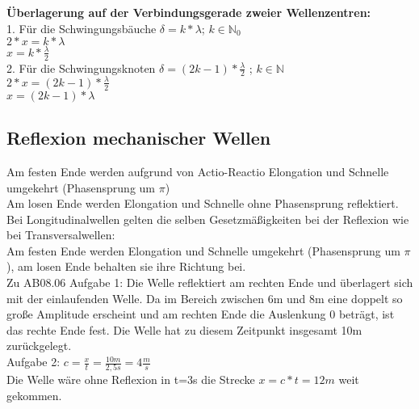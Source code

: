 \textbf{Überlagerung auf der Verbindungsgerade zweier Wellenzentren:}
\vspace{2mm} \\
1. Für die Schwingungsbäuche $ \delta = k \ast \lambda $; $ k \in \mathbb{N}_{0} $
\vspace{1mm} \\
$ 2 \ast x = k \ast \lambda $
\vspace{1mm} \\
$ x = k \ast \frac{\lambda}{2} $
\vspace{3mm} \\
2. Für die Schwingungsknoten $ \delta = (2k -1) \ast \frac{\lambda}{2} $ ; $ k \in \mathbb{N}$
\vspace{1mm} \\
$ 2 \ast x = (2k-1) \ast \frac{\lambda}{2} $
\vspace{1mm} \\
$ x = (2k-1) \ast \lambda $

\subsection{Reflexion mechanischer Wellen}
Am festen Ende werden aufgrund von Actio-Reactio Elongation und Schnelle umgekehrt (Phasensprung um $\pi$) \\
Am losen Ende werden Elongation und Schnelle ohne Phasensprung reflektiert.
\vspace{5mm}\\

Bei Longitudinalwellen gelten die selben Gesetzmäßigkeiten bei der Reflexion wie bei Transversalwellen: \\
Am festen Ende werden Elongation und Schnelle umgekehrt (Phasensprung um $\pi$), am losen Ende behalten sie ihre Richtung bei. 
\vspace{2mm} \\
Zu AB08.06 Aufgabe 1: Die Welle reflektiert am rechten Ende und überlagert sich mit der einlaufenden Welle. Da im Bereich zwischen 6m und 8m eine doppelt so große Amplitude erscheint und am rechten Ende die Auslenkung 0 beträgt, ist das rechte Ende fest. Die Welle hat zu diesem Zeitpunkt insgesamt 10m zurückgelegt. 
\vspace{2mm} \\
Aufgabe 2: $ c = \frac{x}{t} = \frac{10m}{2,5s} = 4 \frac{m}{s} $ 
\vspace{1mm} \\
Die Welle wäre ohne Reflexion in t=3s die Strecke $ x = c \ast t = 12m $ weit gekommen.

